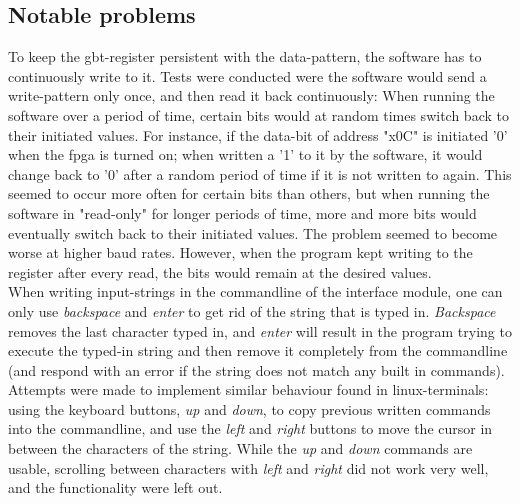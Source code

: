 \documentclass[main.tex]{subfiles}
\begin{document}
\subsection{Notable problems}

To keep the \gls{gbt}-register persistent with the data-pattern, the software has to continuously write to it. Tests were conducted were the software would send a write-pattern only once, and then read it back continuously: When running the software over a period of time, certain bits would at random times switch back to their initiated values. For instance, if the data-bit of address "x0C" is initiated '0' when the \gls{fpga} is turned on; when written a '1' to it by the software, it would change back to '0' after a random period of time if it is not written to again. This seemed to occur more often for certain bits than others, but when running the software in "read-only" for longer periods of time, more and more bits would eventually switch back to their initiated values. The problem seemed to become worse at higher baud rates. However, when the program kept writing to the register after every read, the bits would remain at the desired values.\\

 When writing input-strings in the commandline of the interface module, one can only use \textit{backspace} and \textit{enter} to get rid of the string that is typed in. \textit{Backspace} removes the last character typed in, and \textit{enter} will result in the program trying to execute the typed-in string and then remove it completely from the commandline (and respond with an error if the string does not match any built in commands). Attempts were made to implement similar behaviour found in linux-terminals: using the keyboard buttons, \textit{up} and \textit{down}, to copy previous written commands into the commandline, and use the \textit{left} and \textit{right} buttons to move the cursor in between the characters of the string. While the \textit{up} and \textit{down} commands are usable, scrolling between characters with \textit{left} and \textit{right} did not work very well, and the functionality were left out. 
\end{document}

